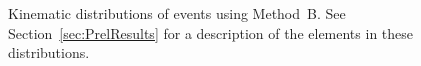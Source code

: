 \documentclass[12pt,twoside,letterpaper,doublespace]{article}
\begin{document}
\begin{figure}[h!]
\centering
\caption[Method B \photwojet]{Kinematic distributions of \photwojet events using \mbox{Method B}. See Section~\ref{sec:PrelResults} for a description of the elements in these distributions.}
\subfigure[]

\end{figure}
\end{document}
